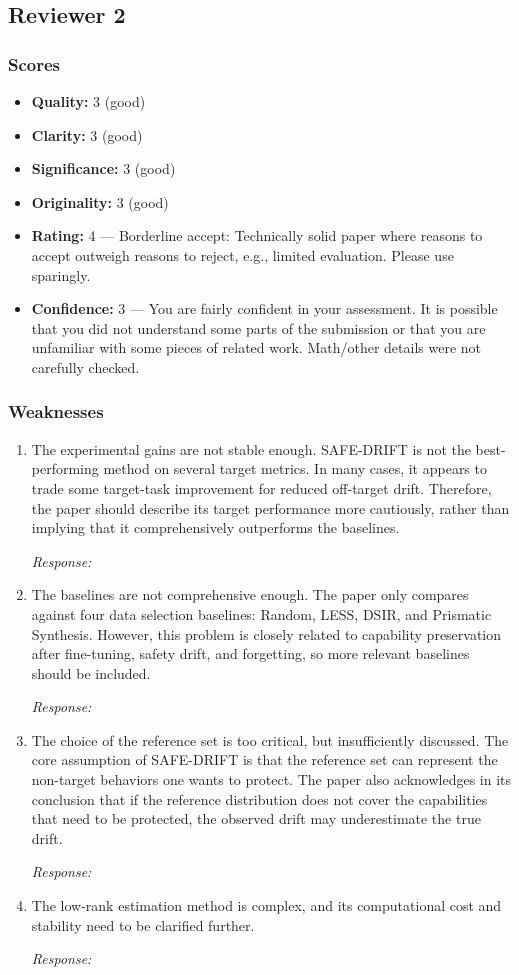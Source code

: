\documentclass{article}
\newcommand{\score}[2]{\textbf{#1:} #2}
\newcommand{\response}[1][Response]{%
  \begin{answerbox}\textit{\small #1:}\end{answerbox}
}
\begin{document}
\subsection{Reviewer 2}
\label{sec:r2}

\subsubsection*{Scores}
\begin{itemize}[nosep]
    \item \score{Quality}{3 (good)}
    \item \score{Clarity}{3 (good)}
    \item \score{Significance}{3 (good)}
    \item \score{Originality}{3 (good)}
    \item \score{Rating}{4 --- Borderline accept: Technically solid paper where reasons to accept outweigh reasons to reject, e.g., limited evaluation. Please use sparingly.}
    \item \score{Confidence}{3 --- You are fairly confident in your assessment. It is possible that you did not understand some parts of the submission or that you are unfamiliar with some pieces of related work. Math/other details were not carefully checked.}
\end{itemize}

\subsubsection*{Weaknesses}
\begin{enumerate}
    \item The experimental gains are not stable enough. SAFE-DRIFT is not the best-performing method on several target metrics. In many cases, it appears to trade some target-task improvement for reduced off-target drift. Therefore, the paper should describe its target performance more cautiously, rather than implying that it comprehensively outperforms the baselines.
    \response
    \item The baselines are not comprehensive enough. The paper only compares against four data selection baselines: Random, LESS, DSIR, and Prismatic Synthesis. However, this problem is closely related to capability preservation after fine-tuning, safety drift, and forgetting, so more relevant baselines should be included.
    \response
    \item The choice of the reference set is too critical, but insufficiently discussed. The core assumption of SAFE-DRIFT is that the reference set can represent the non-target behaviors one wants to protect. The paper also acknowledges in its conclusion that if the reference distribution does not cover the capabilities that need to be protected, the observed drift may underestimate the true drift.
    \response
    \item The low-rank estimation method is complex, and its computational cost and stability need to be clarified further.
    \response
\end{enumerate}
\end{document}
